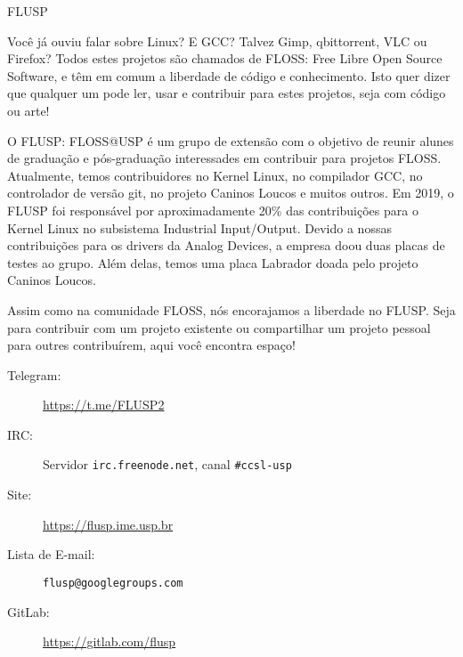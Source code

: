 \begin{subsecao}{FLUSP}


Você já ouviu falar sobre Linux? E GCC? Talvez Gimp, qbittorrent, VLC ou Firefox?
Todos estes projetos são chamados de FLOSS: Free Libre Open Source Software, e
têm em comum a liberdade de código e conhecimento. Isto quer dizer que qualquer
um pode ler, usar e contribuir para estes projetos, seja com código ou arte!

O FLUSP: FLOSS@USP é um grupo de extensão com o objetivo de reunir alunes de
graduação e pós-graduação interessades em contribuir para projetos FLOSS.
Atualmente, temos contribuidores no Kernel Linux, no compilador GCC, no controlador
de versão git, no projeto Caninos Loucos e muitos outros. Em 2019, o FLUSP
foi responsável por aproximadamente 20\% das contribuições para o Kernel Linux no
subsistema Industrial Input/Output. Devido a nossas contribuições para os drivers
da Analog Devices, a empresa doou duas placas de testes ao grupo. Além delas, temos
uma placa Labrador doada pelo projeto Caninos Loucos.

Assim como na comunidade FLOSS, nós encorajamos a liberdade no FLUSP. Seja para
contribuir com um projeto existente ou compartilhar um projeto pessoal para
outres contribuírem, aqui você encontra espaço!

\begin{description}
  \item[Telegram:] \url{https://t.me/FLUSP2}
  \item[IRC:] Servidor \texttt{irc.freenode.net}, canal \texttt{\#ccsl-usp}
  \item[Site:] \url{https://flusp.ime.usp.br}
  \item[Lista de E-mail:] \texttt{flusp@googlegroups.com}
  \item[GitLab:] \url{https://gitlab.com/flusp}
\end{description}

\end{subsecao}
